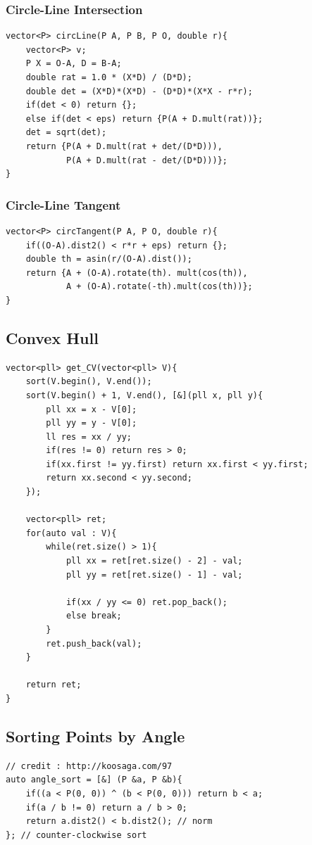\documentclass[landscape, 8pt, a4paper, oneside, twocolumn]{extarticle}
\begin{document}
\subsubsection{Circle-Line Intersection}
\begin{verbatim}
vector<P> circLine(P A, P B, P O, double r){
    vector<P> v;
    P X = O-A, D = B-A;
    double rat = 1.0 * (X*D) / (D*D);
    double det = (X*D)*(X*D) - (D*D)*(X*X - r*r);
    if(det < 0) return {};
    else if(det < eps) return {P(A + D.mult(rat))};
    det = sqrt(det);
    return {P(A + D.mult(rat + det/(D*D))), 
            P(A + D.mult(rat - det/(D*D)))};
}
\end{verbatim}
\subsubsection{Circle-Line Tangent}
\begin{verbatim}
vector<P> circTangent(P A, P O, double r){
    if((O-A).dist2() < r*r + eps) return {};
    double th = asin(r/(O-A).dist());
    return {A + (O-A).rotate(th). mult(cos(th)),
            A + (O-A).rotate(-th).mult(cos(th))};
}
\end{verbatim}
\subsection{Convex Hull}
\begin{verbatim}
vector<pll> get_CV(vector<pll> V){
    sort(V.begin(), V.end());
    sort(V.begin() + 1, V.end(), [&](pll x, pll y){
        pll xx = x - V[0];
        pll yy = y - V[0];
        ll res = xx / yy;
        if(res != 0) return res > 0;
        if(xx.first != yy.first) return xx.first < yy.first;
        return xx.second < yy.second;
    });

    vector<pll> ret;
    for(auto val : V){
        while(ret.size() > 1){
            pll xx = ret[ret.size() - 2] - val;
            pll yy = ret[ret.size() - 1] - val;

            if(xx / yy <= 0) ret.pop_back();
            else break;
        }
        ret.push_back(val);
    }

    return ret;
}
\end{verbatim}
\subsection{Sorting Points by Angle}
\begin{verbatim}
// credit : http://koosaga.com/97
auto angle_sort = [&] (P &a, P &b){
    if((a < P(0, 0)) ^ (b < P(0, 0))) return b < a;
    if(a / b != 0) return a / b > 0;
    return a.dist2() < b.dist2(); // norm
}; // counter-clockwise sort
\end{verbatim}
\end{document}
